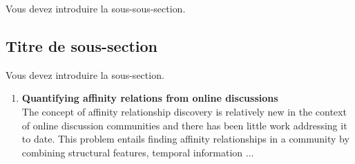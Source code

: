 Vous devez introduire la  sous-sous-section.

\subsection{Titre de sous-section}

Vous devez introduire la  sous-section.

\begin{enumerate}
	\item \textbf{Quantifying affinity relations from online discussions} \\ 
	The concept of affinity relationship discovery is relatively new in the context of online discussion communities and there has been little work addressing it to date. This problem entails finding affinity relationships in a community by combining structural features, temporal information ...
\end{enumerate}

